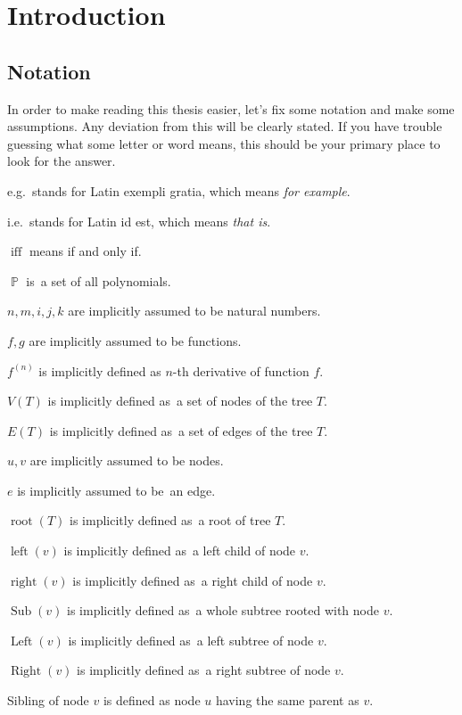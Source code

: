 \documentclass[final]{article}
\theoremstyle{definition}
\theoremstyle{definition}
\theoremstyle{remark}
\DeclareMathOperator{\textiff}{\text{iff}}
\DeclareMathOperator{\poly}{\mathbb{P}}
\DeclareMathOperator{\troot}{\text{root}}
\DeclareMathOperator{\tleft}{\text{left}}
\DeclareMathOperator{\tright}{\text{right}}
\DeclareMathOperator{\tLeft}{\text{Left}}
\DeclareMathOperator{\tRight}{\text{Right}}
\DeclareMathOperator{\tSub}{\text{Sub}}
\begin{document}
\clearpage

\section{Introduction}%
\label{sec:introduction}

\subsection{Notation}%
\label{sub:notation}

In order to make reading this thesis easier, let's fix some notation and make some assumptions. Any deviation from this will be clearly stated. If you have trouble guessing what some letter or word means, this should be your primary place to look for the answer.

e.g.~stands for Latin exempli gratia, which means \textit{for example}.

i.e.~stands for Latin id est, which means \textit{that is}.

\(\textiff\) means if and only if.

\(\poly\) is~a set of all polynomials.

\(n, m, i, j, k\) are implicitly assumed to be natural numbers.

\(f, g\) are implicitly assumed to be functions.

\(f^{(n)}\) is implicitly defined as \(n\)-th derivative of function \(f\).

\(V(T)\) is implicitly defined as~a set of nodes of the tree \(T\).

\(E(T)\) is implicitly defined as~a set of edges of the tree \(T\).

\(u, v\) are implicitly assumed to be nodes.

\(e\) is implicitly assumed to be~an edge.

\(\troot(T)\) is implicitly defined as~a root of tree \(T\).

\(\tleft(v)\) is implicitly defined as~a left child of node \(v\).

\(\tright(v)\) is implicitly defined as~a right child of node \(v\).

\(\tSub(v)\) is implicitly defined as~a whole subtree rooted with node \(v\).

\(\tLeft(v)\) is implicitly defined as~a left subtree of node \(v\).

\(\tRight(v)\) is implicitly defined as~a right subtree of node \(v\).

Sibling of node \(v\) is defined as node \(u\) having the same parent as \(v\).
\end{document}
